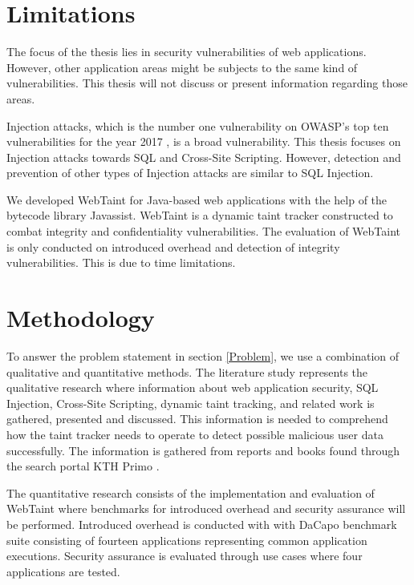 \section{Limitations}
\label{Delimitations}
The focus of the thesis lies in security vulnerabilities of web applications. However, other application areas might be subjects to the same kind of vulnerabilities. This thesis will not discuss or present information regarding those areas. 

Injection attacks, which is the number one vulnerability on OWASP's top ten vulnerabilities for the year 2017 \parencite{OWASP2017}, is a broad vulnerability. This thesis focuses on Injection attacks towards SQL and Cross-Site Scripting. However, detection and prevention of other types of Injection attacks are similar to SQL Injection.

We developed WebTaint for Java-based web applications with the help of the bytecode library Javassist. WebTaint is a dynamic taint tracker constructed to combat integrity and confidentiality vulnerabilities. The evaluation of WebTaint is only conducted on introduced overhead and detection of integrity vulnerabilities. This is due to time limitations.



\section{Methodology}
\label{Methodology}
To answer the problem statement in section \ref{Problem}, we use a combination of qualitative and quantitative methods. The literature study represents the qualitative research where information about web application security, SQL Injection, Cross-Site Scripting, dynamic taint tracking, and related work is gathered, presented and discussed. This information is needed to comprehend how the taint tracker needs to operate to detect possible malicious user data successfully. The information is gathered from reports and books found through the search portal KTH Primo \parencite{primo}.

The quantitative research consists of the implementation and evaluation of WebTaint where benchmarks for introduced overhead and security assurance will be performed. Introduced overhead is conducted with with DaCapo \parencite{dacapo} benchmark suite consisting of fourteen applications representing common application executions. Security assurance is evaluated through use cases where four applications are tested.



